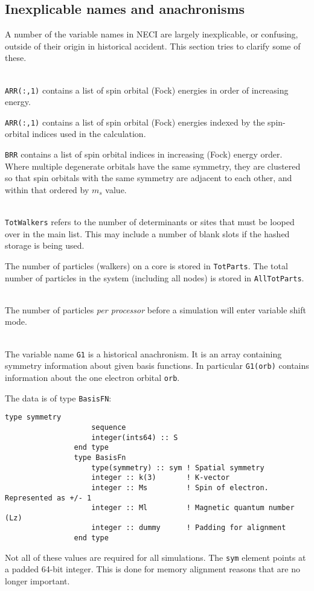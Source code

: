 \documentclass[a4paper,notitlepage]{scrreprt}
\newcommand\headitem[1]{\needspace{1.5\baselineskip}\item[{\boldmath #1 \nopagebreak}] \hfill \\ \nopagebreak}
\let\code\lstinline
\begin{document}
{{{\subsection{Inexplicable names and anachronisms}
	A number of the variable names in NECI are largely inexplicable, or
	confusing, outside of their origin in historical accident. This section
	tries to clarify some of these.

	\begin{description}
		\headitem{ARR, BRR}
			\code{ARR(:,1)} contains a list of spin orbital (Fock)
			energies in	order of increasing energy.

			\code{ARR(:,1)} contains a list of spin orbital (Fock)
			energies indexed by the spin-orbital indices used in the
			calculation.

			\code{BRR} contains a list of spin orbital indices in
			increasing (Fock) energy order. Where multiple degenerate orbitals
			have the same symmetry, they are clustered so that spin orbitals
			with the same symmetry are adjacent to each other, and within that
			ordered by $m_s$ value.

		\headitem{TotWalkers and TotParts}
			\code{TotWalkers} refers to the number of determinants or
			sites that must be looped over in the main list. This may include
			a number of blank slots if the hashed storage is being used.

			The number of particles (walkers) on a core is stored in
			\code{TotParts}. The total number of particles in the system
			(including all nodes) is stored in \code{AllTotParts}.

		\headitem{InitWalkers}
			The number of particles \emph{per processor} before a simulation
			will enter variable shift mode.

		\headitem{G1}
			The variable name \code{G1} is a historical anachronism. It
			is an array containing symmetry information about given basis
			functions. In particular \code{G1(orb)} contains information
			about the one electron orbital \code{orb}.

			The data is of type \code{BasisFN}:
			\begin{lstlisting}[gobble=12]
				type symmetry
					sequence
					integer(ints64) :: S
				end type
				type BasisFn
					type(symmetry) :: sym ! Spatial symmetry 
					integer :: k(3)       ! K-vector
					integer :: Ms         ! Spin of electron. Represented as +/- 1
					integer :: Ml         ! Magnetic quantum number (Lz)
					integer :: dummy      ! Padding for alignment
				end type
			\end{lstlisting}
			Not all of these values are required for all simulations. The
			\code{sym} element points at a padded 64-bit integer. This
			is done for memory alignment reasons that are no longer important.
	\end{description}

}}}
\end{document}
